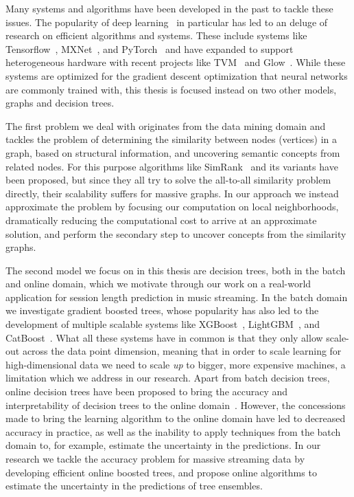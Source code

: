 Many systems and algorithms have been developed in the past to
tackle these issues. The popularity of deep learning~\cite{deep-learning}
in particular has led to an deluge of research on efficient
algorithms and systems. These include systems like Tensorflow~\cite{tensorflow},
MXNet~\cite{mxnet},
and PyTorch~\cite{pytorch} and have expanded to support heterogeneous hardware with recent projects
like TVM~\cite{tvm} and Glow~\cite{glow}. While these systems are optimized for the gradient
descent optimization that neural networks are commonly trained with,
this thesis is focused instead on two other models, graphs and decision
trees.

The first problem we deal with originates
from the data mining domain and tackles the problem of determining the
similarity between nodes (vertices) in a graph, based on structural information,
and uncovering semantic concepts from related nodes.
For this purpose algorithms like SimRank~\cite{simrank} and its variants have been
proposed, but since they all try to solve the all-to-all similarity
problem directly, their scalability suffers for massive graphs.
In our approach we instead approximate the problem by focusing
our computation on local neighborhoods, dramatically reducing the
computational cost to arrive at an approximate solution, and perform
the secondary step to uncover concepts from the similarity graphs.

The second model we focus on in this thesis are decision trees,
both in the batch and online domain, which we motivate through our
work on a real-world application for session length prediction in music streaming.
In the batch domain we investigate
gradient boosted trees, whose popularity has also led
to the development of multiple scalable systems like XGBoost~\cite{xgboost},
LightGBM~\cite{lightgbm}, and CatBoost~\cite{catboost}. What all these
systems have in common is that they only allow scale-out across
the data point dimension, meaning that in order to scale learning
for high-dimensional data we need to scale \emph{up} to bigger, more expensive
machines, a limitation which we address in our research. Apart from
batch decision trees, online decision trees have been proposed
to bring the accuracy and interpretability of decision trees to
the online domain~\cite{vfdt}. However, the concessions made to
bring the learning algorithm to the online domain have led to
decreased accuracy in practice, as well as the inability to apply
techniques from the batch domain to, for example, estimate the uncertainty
in the predictions. In our research we tackle the accuracy problem for
massive streaming data by developing efficient online boosted trees,
and propose online algorithms to estimate the uncertainty in the
predictions of tree ensembles.

